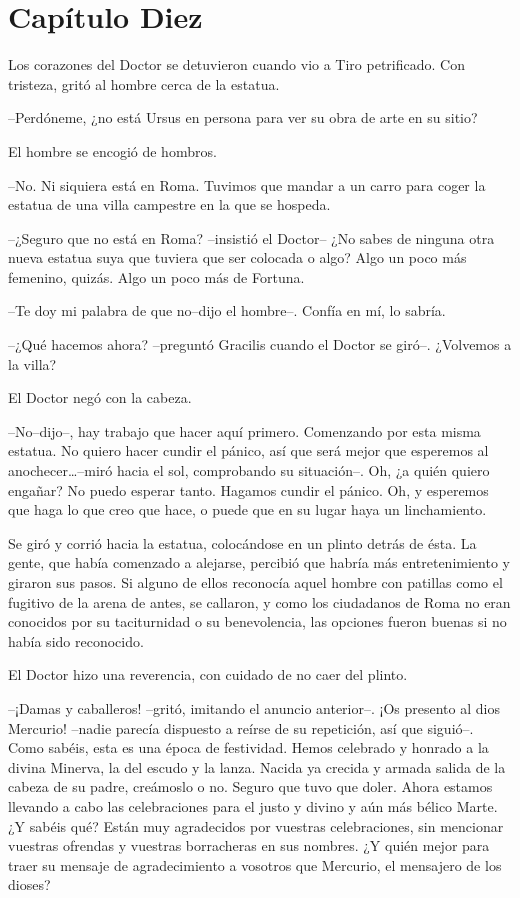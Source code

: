 \chapter*{Capítulo Diez}

Los corazones del Doctor se detuvieron cuando vio a Tiro petrificado.
Con tristeza, gritó al hombre cerca de la estatua.

--Perdóneme, ¿no está Ursus en persona para ver su obra de arte en su
sitio?

El hombre se encogió de hombros.

--No. Ni siquiera está en Roma. Tuvimos que mandar a un carro para coger
la estatua de una villa campestre en la que se hospeda.

--¿Seguro que no está en Roma? --insistió el Doctor-- ¿No sabes de
ninguna otra nueva estatua suya que tuviera que ser colocada o algo?
Algo un poco más femenino, quizás. Algo un poco más de Fortuna.

--Te doy mi palabra de que no--dijo el hombre--. Confía en mí, lo
sabría.

--¿Qué hacemos ahora? --preguntó Gracilis cuando el Doctor se giró--.
¿Volvemos a la villa?

El Doctor negó con la cabeza.

--No--dijo--, hay trabajo que hacer aquí primero. Comenzando por esta
misma estatua. No quiero hacer cundir el pánico, así que será mejor que
esperemos al anochecer\ldots{}--miró hacia el sol, comprobando su
situación--. Oh, ¿a quién quiero engañar? No puedo esperar tanto.
Hagamos cundir el pánico. Oh, y esperemos que haga lo que creo que hace,
o puede que en su lugar haya un linchamiento.

Se giró y corrió hacia la estatua, colocándose en un plinto detrás de
ésta. La gente, que había comenzado a alejarse, percibió que habría más
entretenimiento y giraron sus pasos. Si alguno de ellos reconocía aquel
hombre con patillas como el fugitivo de la arena de antes, se callaron,
y como los ciudadanos de Roma no eran conocidos por su taciturnidad o su
benevolencia, las opciones fueron buenas si no había sido reconocido.

El Doctor hizo una reverencia, con cuidado de no caer del plinto.

--¡Damas y caballeros! --gritó, imitando el anuncio anterior--. ¡Os
presento al dios Mercurio! --nadie parecía dispuesto a reírse de su
repetición, así que siguió--. Como sabéis, esta es una época de
festividad. Hemos celebrado y honrado a la divina Minerva, la del escudo
y la lanza. Nacida ya crecida y armada salida de la cabeza de su padre,
creámoslo o no. Seguro que tuvo que doler. Ahora estamos llevando a cabo
las celebraciones para el justo y divino y aún más bélico Marte. ¿Y
sabéis qué? Están muy agradecidos por vuestras celebraciones, sin
mencionar vuestras ofrendas y vuestras borracheras en sus nombres. ¿Y
quién mejor para traer su mensaje de agradecimiento a vosotros que
Mercurio, el mensajero de los dioses?

